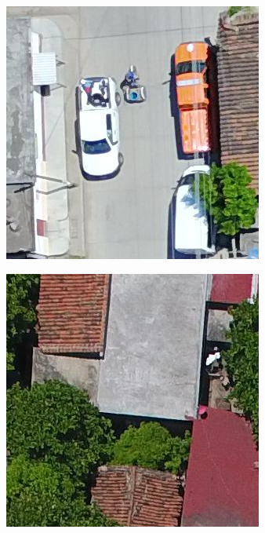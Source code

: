 \begin{figure}[!ht]
\begin{subfigure}{.24\textwidth}
    \end{subfigure}
    \begin{subfigure}{.24\textwidth}
        \includegraphics[width=\textwidth]{images/nondamaged5.jpg}
    \end{subfigure}
    \begin{subfigure}{.24\textwidth}
        \includegraphics[width=\textwidth]{images/nondamaged6.jpg}

\end{subfigure}
\end{figure}
